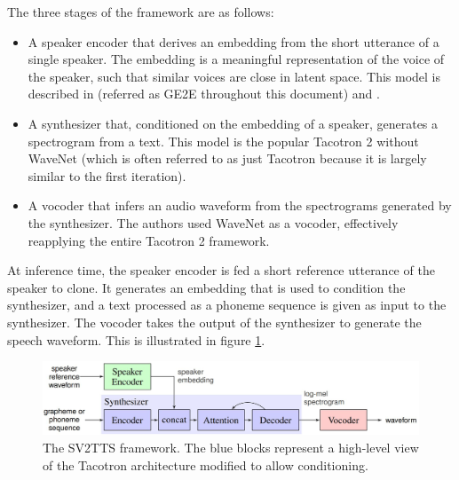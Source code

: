 \documentclass[a4paper, oneside, 12pt, english]{article}
\begin{document}
The three stages of the framework are as follows:
\begin{itemize}
	\item A speaker encoder that derives an embedding from the short utterance of a single speaker. The embedding is a meaningful representation of the voice of the speaker, such that similar voices are close in latent space. This model is described in \citep{GE2E} (referred as GE2E throughout this document) and \citep{TE2E}.
	\item A synthesizer that, conditioned on the embedding of a speaker, generates a spectrogram from a text. This model is the popular Tacotron 2 \citep{Tacotron2} without WaveNet (which is often referred to as just Tacotron because it is largely similar to the first iteration).
	\item A vocoder that infers an audio waveform from the spectrograms generated by the synthesizer. The authors used WaveNet \citep{WaveNet} as a vocoder, effectively reapplying the entire Tacotron 2 framework.
\end{itemize}
At inference time, the speaker encoder is fed a short reference utterance of the speaker to clone. It generates an embedding that is used to condition the synthesizer, and a text processed as a phoneme sequence is given as input to the synthesizer. The vocoder takes the output of the synthesizer to generate the speech waveform. This is illustrated in figure \ref{sv2tts_framework}.

\begin{figure}[h]
	\centering
	\includegraphics[width=\linewidth]{images/sv2tts_framework.jpg}
	\caption{The SV2TTS framework. The blue blocks represent a high-level view of the Tacotron architecture modified to allow conditioning.}
	\label{sv2tts_framework}
\end{figure}
\end{document}

